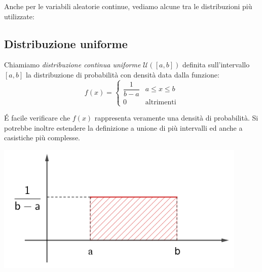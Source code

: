 Anche per le variabili aleatorie continue, vediamo alcune tra le distribuzioni più utilizzate:

\subsection{Distribuzione uniforme}

\begin{definizione} Chiamiamo \emph{distribuzione continua uniforme} $\mathcal{U}([a,b])$ definita sull'intervallo $[a,b]$ la distribuzione di probabilità con densità data dalla funzione:
\[f(x) = \begin{cases} \dfrac{1}{b-a} & a\leq x\leq b \\
0 & \text{altrimenti}\end{cases}\]
\end{definizione}

\begin{minipage}[c]{.45\textwidth}
\'E facile verificare che $f(x)$ rappresenta veramente una densità di probabilità. Si potrebbe inoltre estendere la definizione a unione di più intervalli ed anche a casistiche più complesse.
\end{minipage}
\begin{minipage}[c]{.55\textwidth}
\begin{center}
  \includegraphics[width=0.9\textwidth]{img/Uniforme_continua.png}
\end{center}
\end{minipage}

